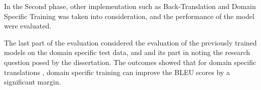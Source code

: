 In the Second phase, other implementation such as Back-Translation and Domain Specific Training was taken into consideration, and the performance of the model were evaluated.

The last part of the evaluation considered the evaluation of the previously trained models on the domain specific test data, and and its part in noting the research question posed by the dissertation. The outcomes showed that for domain specific translations , domain specific training can improve the BLEU scores by a significant margin.